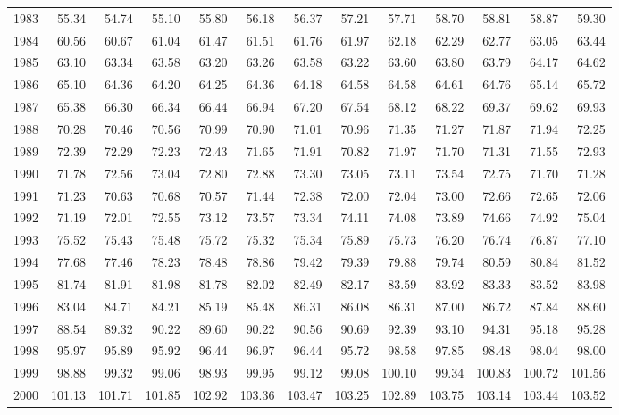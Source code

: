 \begin{longtable}{rrrrrrrrrrrrr}
  1983 & 55.34 & 54.74 & 55.10 & 55.80 & 56.18 & 56.37 & 57.21 & 57.71 & 58.70 & 58.81 & 58.87 & 59.30 \\ 
  1984 & 60.56 & 60.67 & 61.04 & 61.47 & 61.51 & 61.76 & 61.97 & 62.18 & 62.29 & 62.77 & 63.05 & 63.44 \\ 
  1985 & 63.10 & 63.34 & 63.58 & 63.20 & 63.26 & 63.58 & 63.22 & 63.60 & 63.80 & 63.79 & 64.17 & 64.62 \\ 
  1986 & 65.10 & 64.36 & 64.20 & 64.25 & 64.36 & 64.18 & 64.58 & 64.58 & 64.61 & 64.76 & 65.14 & 65.72 \\ 
  1987 & 65.38 & 66.30 & 66.34 & 66.44 & 66.94 & 67.20 & 67.54 & 68.12 & 68.22 & 69.37 & 69.62 & 69.93 \\ 
  1988 & 70.28 & 70.46 & 70.56 & 70.99 & 70.90 & 71.01 & 70.96 & 71.35 & 71.27 & 71.87 & 71.94 & 72.25 \\ 
  1989 & 72.39 & 72.29 & 72.23 & 72.43 & 71.65 & 71.91 & 70.82 & 71.97 & 71.70 & 71.31 & 71.55 & 72.93 \\ 
  1990 & 71.78 & 72.56 & 73.04 & 72.80 & 72.88 & 73.30 & 73.05 & 73.11 & 73.54 & 72.75 & 71.70 & 71.28 \\ 
  1991 & 71.23 & 70.63 & 70.68 & 70.57 & 71.44 & 72.38 & 72.00 & 72.04 & 73.00 & 72.66 & 72.65 & 72.06 \\ 
  1992 & 71.19 & 72.01 & 72.55 & 73.12 & 73.57 & 73.34 & 74.11 & 74.08 & 73.89 & 74.66 & 74.92 & 75.04 \\ 
  1993 & 75.52 & 75.43 & 75.48 & 75.72 & 75.32 & 75.34 & 75.89 & 75.73 & 76.20 & 76.74 & 76.87 & 77.10 \\ 
  1994 & 77.68 & 77.46 & 78.23 & 78.48 & 78.86 & 79.42 & 79.39 & 79.88 & 79.74 & 80.59 & 80.84 & 81.52 \\ 
  1995 & 81.74 & 81.91 & 81.98 & 81.78 & 82.02 & 82.49 & 82.17 & 83.59 & 83.92 & 83.33 & 83.52 & 83.98 \\ 
  1996 & 83.04 & 84.71 & 84.21 & 85.19 & 85.48 & 86.31 & 86.08 & 86.31 & 87.00 & 86.72 & 87.84 & 88.60 \\ 
  1997 & 88.54 & 89.32 & 90.22 & 89.60 & 90.22 & 90.56 & 90.69 & 92.39 & 93.10 & 94.31 & 95.18 & 95.28 \\ 
  1998 & 95.97 & 95.89 & 95.92 & 96.44 & 96.97 & 96.44 & 95.72 & 98.58 & 97.85 & 98.48 & 98.04 & 98.00 \\ 
  1999 & 98.88 & 99.32 & 99.06 & 98.93 & 99.95 & 99.12 & 99.08 & 100.10 & 99.34 & 100.83 & 100.72 & 101.56 \\ 
  2000 & 101.13 & 101.71 & 101.85 & 102.92 & 103.36 & 103.47 & 103.25 & 102.89 & 103.75 & 103.14 & 103.44 & 103.52 \\ 

\end{longtable}
